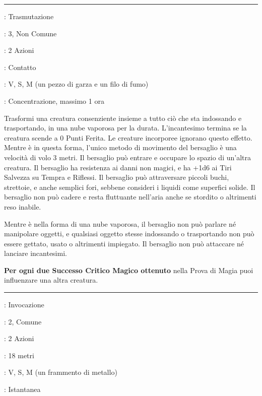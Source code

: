 \begin{multicols}{2}
\smallskip\noindent\rule{\linewidth}{2pt} \hypertarget{Forma Gassosa}{}\smallskip{}
\noindent
\begin{description}[noitemsep, topsep=0pt, parsep=0pt, partopsep=0pt, leftmargin=0cm, labelwidth=2.8cm]
	\item[\textbf{Lista di Magia}]: Trasmutazione
	\item[\textbf{Livello}]: 3, Non Comune
	\item[\textbf{T. di Lancio}]: 2 Azioni
	\item[\textbf{Gittata}]: Contatto
	\item[\textbf{Componenti}]: V, S, M (un pezzo di garza e un filo di fumo)
	\item[\textbf{Durata}]: Concentrazione, massimo 1 ora
\end{description}

Trasformi una creatura consenziente insieme a tutto ciò che sta indossando e trasportando, in una nube vaporosa per la durata. L'incantesimo termina se la creatura scende a 0 Punti Ferita. Le creature incorporee ignorano questo effetto. Mentre è in questa forma, l'unico metodo di movimento del bersaglio è una velocità di volo 3 metri. Il bersaglio può entrare e occupare lo spazio di un'altra creatura. Il bersaglio ha resistenza ai danni non magici, e ha +1d6 ai Tiri Salvezza su Tempra e Riflessi. Il bersaglio può attraversare piccoli buchi, strettoie, e anche semplici fori, sebbene consideri i liquidi come superfici solide. Il bersaglio non può cadere e resta fluttuante nell'aria anche se stordito o altrimenti reso inabile.

Mentre è nella forma di una nube vaporosa, il bersaglio non può parlare né manipolare oggetti, e qualsiasi oggetto stesse indossando o trasportando non può essere gettato, usato o altrimenti impiegato. Il bersaglio non può attaccare né lanciare incantesimi.

\textbf{Per ogni due Successo Critico Magico ottenuto} nella Prova di Magia puoi influenzare una altra creatura.

\smallskip\noindent\rule{\linewidth}{2pt} \hypertarget{Frantumare}{}\smallskip{}
\noindent
\begin{description}[noitemsep, topsep=0pt, parsep=0pt, partopsep=0pt, leftmargin=0cm, labelwidth=2.8cm]
	\item[\textbf{Lista di Magia}]: Invocazione
	\item[\textbf{Livello}]: 2, Comune
	\item[\textbf{T. di Lancio}]: 2 Azioni
	\item[\textbf{Gittata}]: 18 metri
	\item[\textbf{Componenti}]: V, S, M (un frammento di metallo)
	\item[\textbf{Durata}]: Istantanea
\end{description}


\end{multicols}
